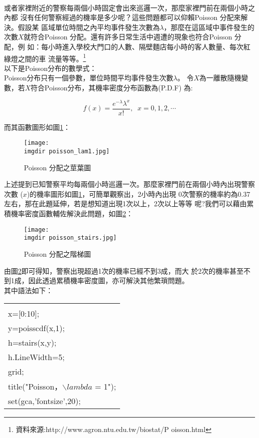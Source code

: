\begin{enumerate}
{					\bigskip
					\\					
					或者家裡附近的警察每兩個小時固定會出來巡邏一次，那麼家裡門前在兩個小時之內都						沒有任何警察經過的機率是多少呢？這些問題都可以仰賴Poisson 分配來解決。假設某						區域單位時間之內平均事件發生次數為$\lambda$，那麼在這區域中事件發生的次數$X						$就符合Poisson 分配。還有許多日常生活中週遭的現象也符合Poisson 分配，例							如：每小時進入學校大門口的人數、隔壁麵店每小時的客人數量、每次紅綠燈之間的車						流量等等。\footnote{資料來源:http://www.agron.ntu.edu.tw/biostat/P							oisson.html}	
					\bigskip
					\\					
					以下是Poisson分布的數學式：\\
					Poisson分布只有一個參數，單位時間平均事件發生次數$\lambda$。
					令$X$為一離散隨機變數，若$X$符合Poisson分布，其機率密度分布函數為(P.D.F)						為:
					
					$$f(x)=\frac{e^{-\lambda}\lambda^x}{x!}, \;\;  x=0,1,2,\cdots$$ 
					
					而其函數圖形如圖\ref{poisson_lam1}：
					\begin{figure}[H]	
		 		 		\centering	 			 	 
   				 		\texttt{[image: \\imgdir poisson\_lam1.jpg]} 
   			 			\caption{Poisson 分配之莖葉圖}   		
   			 			\label{poisson_lam1}   			 		 
					\end{figure}
					上述提到已知警察平均每兩個小時巡邏一次。那麼家裡門前在兩個小時內出現警察次數						($x$)的機率圖形如圖\ref{poisson_lam1}，可簡單觀察出，2小時內出現
					0次警察的機率約為0.37左右，那在此題延伸，若是想知道出現1次以上，2次以上等等						呢?我們可以藉由累積機率密度函數輔佐解決此問題，如圖\ref{poisson_stairs}：
					\begin{figure}[H]	
		 		 		\centering	 			 	 
   				 		\texttt{[image: \\imgdir 												poisson\_stairs.jpg]} 
   			 			\caption{Poisson 分配之階梯圖}   		
   			 			\label{poisson_stairs}   			 		 
					\end{figure}
					由圖\ref{poisson_stairs}即可得知，警察出現超過1次的機率已經不到3成，而大						於2次的機率甚至不到1成，因此透過累積機率密度圖，亦可解決其他繁瑣問題。
					\bigskip
					\\					
					其中語法如下：
					\begin{center}\colorbox{slight}{
						\begin{tabular}{p{}}
							\MJHmarker{\textbf{\color{darkblue}{MATLAB語法 :}}}\\		
							x=[0:10];\\
							y=poisscdf(x,1);\\
							h=stairs(x,y);\\
							h.LineWidth=5;\\
							grid;  \\
							title("Poisson，$\backslash lambda$ = 1");   \\
							set(gca,'fontsize',20); \\
						\end{tabular}
					}
					\end{center}
											
}
\end{enumerate}

